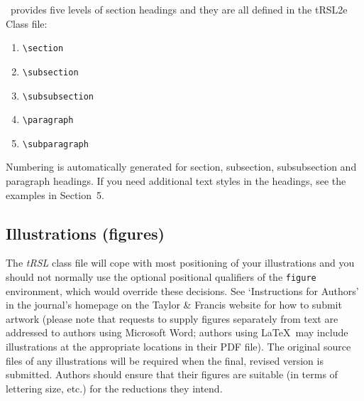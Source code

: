 \documentclass[]{tRSL2e}
\begin{document}
\LaTeXe\ provides five levels of section headings and they are all defined in the tRSL2e Class file:
\begin{enumerate}
   \item \verb"\section"
   \item \verb"\subsection"
   \item \verb"\subsubsection"
   \item \verb"\paragraph"
   \item \verb"\subparagraph"
\end{enumerate}
Numbering is automatically generated for section, subsection, subsubsection and paragraph headings.  If you need
additional text styles in the headings, see the examples in Section~5.


\subsection{Illustrations (figures)}

The {\it tRSL} class file will cope with most positioning of your illustrations and you should not normally use the optional positional qualifiers of the {\tt figure} environment, which would override these decisions. See `Instructions for Authors' in the journal's homepage on the Taylor \& Francis website for how to submit artwork (please note that requests to supply figures separately from text are addressed to authors using Microsoft Word; authors using \LaTeX\ may include illustrations at the appropriate locations in their PDF file). The original source files of any illustrations will be required when the final, revised version is submitted. Authors should ensure that their figures are suitable (in terms of lettering size, etc.) for the reductions they intend.
\end{document}
